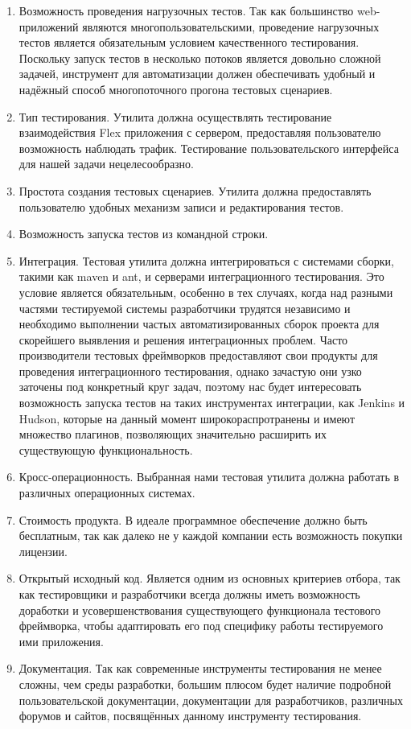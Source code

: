 \begin{enumerate}
\item Возможность проведения нагрузочных тестов. Так как большинство 
web-приложений являются многопользовательскими, проведение нагрузочных
тестов является обязательным условием качественного тестирования. Поскольку
запуск тестов в несколько потоков является довольно сложной задачей, 
инструмент для автоматизации должен обеспечивать удобный и надёжный способ 
многопоточного прогона тестовых сценариев.
\item Тип тестирования. Утилита должна осуществлять тестирование 
взаимодействия Flex приложения с сервером, предоставляя пользователю возможность 
наблюдать трафик. Тестирование пользовательского интерфейса для нашей 
задачи нецелесообразно.
\item Простота создания тестовых сценариев. Утилита должна предоставлять 
пользователю удобных механизм записи и редактирования тестов.
\item Возможность запуска тестов из командной строки.
\item Интеграция. Тестовая утилита должна интегрироваться с системами сборки, 
такими как maven и ant, и серверами интеграционного тестирования. Это условие 
является обязательным, особенно в тех случаях, когда над разными частями 
тестируемой системы разработчики трудятся независимо и необходимо 
выполнении частых автоматизированных сборок проекта для скорейшего 
выявления и решения интеграционных проблем. Часто производители тестовых 
фреймворков предоставляют свои продукты для проведения интеграционного тестирования, однако 
зачастую они узко заточены под конкретный круг задач, поэтому нас будет интересовать 
возможность запуска тестов на таких инструментах интеграции, как Jenkins и  
Hudson, которые на данный момент широкораспротранены и имеют множество плагинов, позволяющих 
значительно расширить их существующую функциональность.    
\item Кросс-операционность. Выбранная нами тестовая утилита должна работать 
в различных операционных системах.
\item Стоимость продукта. В идеале программное обеспечение должно быть 
бесплатным, так как далеко не у каждой компании есть возможность покупки 
лицензии.  
\item Открытый исходный код. Является одним из основных критериев отбора, 
так как тестировщики и разработчики всегда должны иметь возможность доработки и 
усовершенствования существующего функционала тестового фреймворка, чтобы 
адаптировать его под специфику работы тестируемого ими приложения.
\item Документация. Так как современные инструменты тестирования не 
менее сложны, чем среды разработки, большим плюсом будет наличие подробной 
пользовательской документации, документации для разработчиков, различных 
форумов и сайтов, посвящённых данному инструменту тестирования. 
\end{enumerate}

